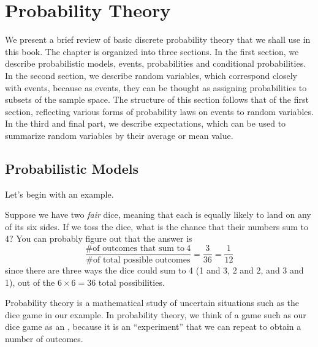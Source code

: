 \chapter{Probability Theory}
\label{ch:probability}
{ 

\newcommand{\qsort}{quicksort}
\newcommand{\Qsort}{Quicksort}


\newcommand{\SSpace}{\ensuremath{\Omega}}
\newcommand{\EventE}{\mathcal{E}}

We present a brief review of basic discrete probability theory that we
shall use in this book.
%
The  chapter is organized into three sections.  In the first section,
we describe probabilistic models, events, probabilities and
conditional probabilities. 
%
In the second section, we describe random variables, which correspond
closely with events, because as events, they can be thought as
assigning probabilities to subsets of the sample space.
%
The structure of this section follows that of the first section,
reflecting various forms of probability laws on events to random
variables.
%
In the third and final part, we describe expectations, which can be
used to summarize random variables by their average or mean value.
%


\section{Probabilistic Models}
\label{sec:probability}

Let's begin with an example.

\begin{example}
Suppose we have two \emph{fair} dice, meaning that each is equally
likely to land on any of its six sides.  If we toss the dice, what is
the chance that their numbers sum to $4$?  
%
You can probably figure out
that the answer is
\begin{equation*}
\frac
{\text{\# of outcomes that sum to}~4}
{\text{\# of total possible outcomes}} 
= 
\frac{3}{36} = \frac{1}{12}
\end{equation*}
since there are three ways the dice could sum to 4 (1 and 3, 2 and 2,
and 3 and 1), out of the $6 \times 6 = 36$ total possibilities.
\end{example}
%

Probability theory is a mathematical study of uncertain situations
such as the dice game in our example.
%
In probability theory, we think of a game such as our dice game as an
, because it is an ``experiment'' that we can repeat
to obtain a number of outcomes.

}
